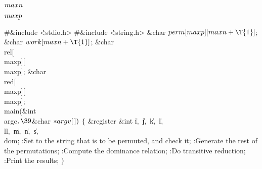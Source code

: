 \Y\B\4\D$\\{maxn}$ \5
\par
\B\4\D$\\{maxp}$ \5
\par
\Y\B\8\#\&{include} \.{<stdio.h>}\6
\8\#\&{include} \.{<string.h>}\6
\&{char} ${}\\{perm}[\\{maxp}][\\{maxn}+\T{1}]{}$;\6
\&{char} ${}\\{work}[\\{maxn}+\T{1}]{}$;\6
\&{char} \\{rel}[\\{maxp}][\\{maxp}];\6
\&{char} \\{red}[\\{maxp}][\\{maxp}];\7
\\{main}(\&{int} \\{argc}${},\39{}$\&{char} ${}{*}\\{argv}[\,]){}$\1\1\2\2\6
${}\{{}$\1\6
\&{register} \&{int} \|i${},{}$ \|j${},{}$ \|k${},{}$ \|l${},{}$ \\{ll}${},{}$ %
\|m${},{}$ \|n${},{}$ \|s${},{}$ \\{dom};\7
:Set  to the string that is to be permuted, and check it\X;\6
:Generate the rest of the permutations\X;\6
:Compute the dominance relation\X;\6
:Do transitive reduction\X;\6
:Print the results\X;\6
\4${}\}{}$\2\par
\fi

